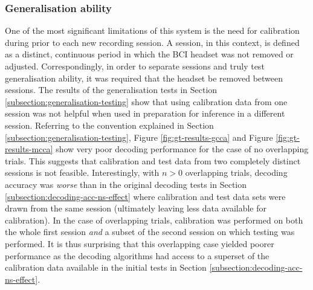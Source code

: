 \subsubsection{Generalisation ability}
One of the most significant limitations of this system is the need for calibration during prior to each new recording session. A session, in this context, is defined as a distinct, continuous period in which the BCI headset was not removed or adjusted. Correspondingly, in order to separate sessions and truly test generalisation ability, it was required that the headset be removed between sessions. The results of the generalisation tests in Section \ref{subsection:generalisation-testing} show that using calibration data from one session was not helpful when used in preparation for inference in a different session. Referring to the convention explained in Section \ref{subsection:generalisation-testing}, Figure \ref{fig:gt-results-gcca} and Figure \ref{fig:gt-results-mcca} show very poor decoding performance for the case of no overlapping trials. This suggests that calibration and test data from two completely distinct sessions is not feasible. Interestingly, with $n>0$ overlapping trials, decoding accuracy was \textit{worse} than in the original decoding tests in Section \ref{subsection:decoding-acc-ns-effect} where calibration and test data sets were drawn from the same session (ultimately leaving less data available for calibration). In the case of overlapping trials, calibration was performed on both the whole first session \textit{and} a subset of the second session on which testing was performed. It is thus surprising that this overlapping case yielded poorer performance as the decoding algorithms had access to a superset of the calibration data available in the initial tests in Section \ref{subsection:decoding-acc-ns-effect}. 

